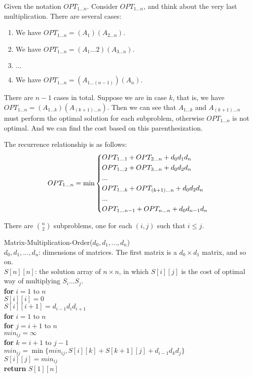 \documentclass[twoside]{article}
\newcommand{\pc}[1]{\mbox{\textbf{#1}}} %
\begin{document}
Given the notation $OPT_{1...n}$. Consider $OPT_{1...n}$, and think about the very last multiplication. There are several cases: \begin{enumerate}
\item We have $OPT_{1...n} = (A_1)(A_{2...n})$. 
\item We have $OPT_{1...n} = (A_1...2)(A_{3...n})$. 
\item $...$
\item We have $OPT_{1...n} = (A_{1...(n-1)})(A_{n})$. 
\end{enumerate}

There are $n-1$ cases in total. Suppose we are in case $k$, that is, we have $OPT_{1...n} = (A_{1...k})(A_{(k+1)...n})$. Then we can see that $A_{1...k}$ and $A_{(k+1)...n}$ must perform the optimal solution for each subproblem, otherwise $OPT_{1...n}$ is not optimal. And we can find the cost based on this parenthesization. 

The recurrence relationship is as follows: $$OPT_{1...n} = \min\begin{dcases}
OPT_{1...1} + OPT_{2...n} + d_0d_1d_n\\
OPT_{1...2} + OPT_{3...n} + d_0d_2d_n\\
...\\
OPT_{1...k} + OPT_{(k+1)...n} + d_0d_2d_n\\
...\\
OPT_{1...n-1} + OPT_{n...n} + d_0d_{n-1}d_n
\end{dcases}$$

There are $n \choose 2$ subproblems, one for each $(i, j)$ such that $i \leq j$. 

\begin{algorithme}
	Matrix-Multiplication-Order($d_0, d_1, ..., d_n$)\\
	$d_0, d_1, ..., d_n$: dimensions of matrices. The first matrix is a $d_0 \times d_1$ matrix, and so on. \\
	\> $S[n][n]$: the solution array of $n \times n$, in which $S[i][j]$ is the cost of optimal way of multiplying $S_{i} ... S_j$. \\
	\>\pc{for} $i = 1$ to $n$\\
	\>\>$S[i][i] = 0$\\
	\>\>$S[i][i+1] = d_{i-1}d_id_{i+1}$\\
	\>\pc{for} $i = 1$ to $n$\\
	\>\>\pc{for}  $j = i+1$ to $n$\\
	\>\>\>$min_{ij} = \infty$\\
	\>\>\>\pc{for} $k = i+1$ to $j-1$\\
	\>\>\>\>$min_{ij} = \min \{min_{ij}, S[i][k] + S[k+1][j] + d_{i-1}d_kd_j\}$\\
	\>\>\>$S[i][j] = min_{ij}$\\
	\>\pc{return} $S[1][n]$
\end{algorithme}
\end{document}
